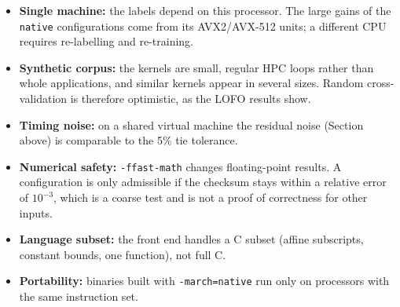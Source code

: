 \begin{itemize}
    \item \textbf{Single machine:} the labels depend on this processor. The large gains of the
    \texttt{native} configurations come from its AVX2/AVX-512 units; a different CPU requires re-labelling and re-training.
    \item \textbf{Synthetic corpus:} the kernels are small, regular HPC loops rather than whole applications, and similar
    kernels appear in several sizes. Random cross-validation is therefore optimistic, as the LOFO results show.
    \item \textbf{Timing noise:} on a shared virtual machine the residual noise (Section above) is comparable to the 5\% tie tolerance.
    \item \textbf{Numerical safety:} \texttt{-ffast-math} changes floating-point results. A configuration is only admissible if
    the checksum stays within a relative error of $10^{-3}$, which is a coarse test and is not a proof of correctness for other inputs.
    \item \textbf{Language subset:} the front end handles a C subset (affine subscripts, constant bounds, one function), not full C.
    \item \textbf{Portability:} binaries built with \texttt{-march=native} run only on processors with the same instruction set.
\end{itemize}

\newpage
